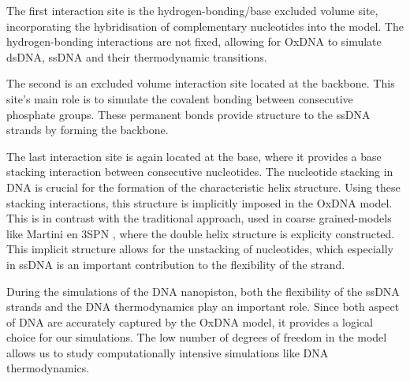 The first interaction site is the hydrogen-bonding/base excluded volume site,
incorporating the hybridisation of complementary nucleotides into the model. The
hydrogen-bonding interactions are not fixed, allowing for OxDNA to simulate dsDNA, ssDNA
and their thermodynamic transitions.

The second is an excluded volume interaction site located at the backbone.
This site's main role is to simulate the covalent bonding between consecutive phosphate
groups. These permanent bonds provide structure to the ssDNA strands by forming the
backbone.

The last interaction site is again located at the base, where it provides a base stacking
interaction between consecutive nucleotides. The nucleotide stacking in DNA is crucial
for the formation of the characteristic helix structure. Using these stacking
interactions, this structure is implicitly imposed in the OxDNA model. This is in
contrast with the traditional approach, used in coarse grained-models like Martini
\cite{Souza2021} en
3SPN \cite{Freeman2011},
where the double helix structure is explicity constructed. This
implicit structure allows for the
unstacking of nucleotides, which especially in ssDNA is an important contribution to the
flexibility of the strand.

During the simulations of the DNA nanopiston, both the flexibility of the ssDNA strands
and the DNA thermodynamics play an important role. Since both aspect of DNA are
accurately captured by the OxDNA model, it provides a logical choice
for our simulations. The low number of degrees of freedom in the model allows us to
study computationally intensive simulations like DNA thermodynamics.

